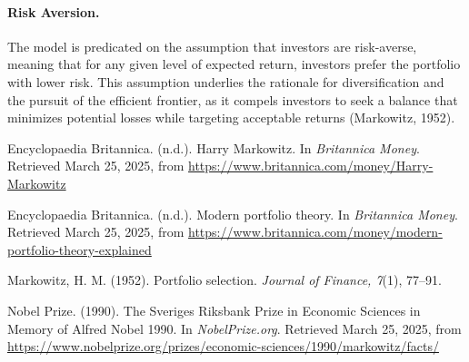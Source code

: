 \documentclass[12pt]{article}
\begin{document}
\paragraph{Risk Aversion.} The model is predicated on the assumption that investors are risk-averse, meaning that for any given level of expected return, investors prefer the portfolio with lower risk. This assumption underlies the rationale for diversification and the pursuit of the efficient frontier, as it compels investors to seek a balance that minimizes potential losses while targeting acceptable returns (Markowitz, 1952).

\newpage

\begin{spacing}{1.5}
\begin{thebibliography}{9}

Encyclopaedia Britannica. (n.d.). Harry Markowitz. In \textit{Britannica Money}. Retrieved March 25, 2025, from \url{https://www.britannica.com/money/Harry-Markowitz}

Encyclopaedia Britannica. (n.d.). Modern portfolio theory. In \textit{Britannica Money}. Retrieved March 25, 2025, from \url{https://www.britannica.com/money/modern-portfolio-theory-explained}

Markowitz, H. M. (1952). Portfolio selection. \textit{Journal of Finance, 7}(1), 77--91.

Nobel Prize. (1990). The Sveriges Riksbank Prize in Economic Sciences in Memory of Alfred Nobel 1990. In \textit{NobelPrize.org}. Retrieved March 25, 2025, from \url{https://www.nobelprize.org/prizes/economic-sciences/1990/markowitz/facts/}

\end{thebibliography}
\end{spacing}
\end{document}
